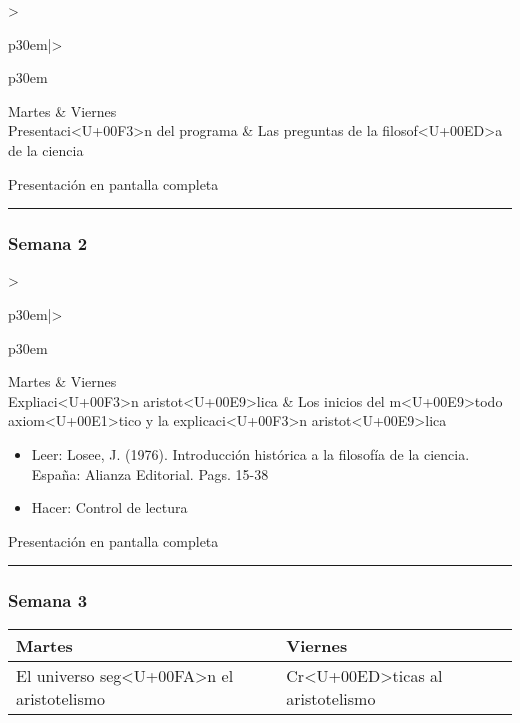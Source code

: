 \documentclass[spanish,]{article}
\begin{document}
\begin{tabular}{>{\raggedright\arraybackslash}p{30em}|>{\raggedright\arraybackslash}p{30em}}
\hline
Martes & Viernes\\
\hline
Presentaci<U+00F3>n del programa & Las preguntas de la filosof<U+00ED>a de la ciencia\\
\hline
\end{tabular}

Presentación en pantalla completa

\begin{center}\rule{0.5\linewidth}{\linethickness}\end{center}

\subsubsection{Semana 2}\label{semana-2}

\begin{tabular}{>{\raggedright\arraybackslash}p{30em}|>{\raggedright\arraybackslash}p{30em}}
\hline
Martes & Viernes\\
\hline
Expliaci<U+00F3>n aristot<U+00E9>lica & Los inicios del m<U+00E9>todo axiom<U+00E1>tico y la explicaci<U+00F3>n aristot<U+00E9>lica\\
\hline
\end{tabular}

\begin{itemize}
\item
  Leer: Losee, J. (1976). Introducción histórica a la filosofía de la
  ciencia. España: Alianza Editorial. Pags. 15-38
\item
  Hacer: Control de lectura
\end{itemize}

Presentación en pantalla completa

\begin{center}\rule{0.5\linewidth}{\linethickness}\end{center}

\subsubsection{Semana 3}\label{semana-3}

\begin{tabular}{>{\raggedright\arraybackslash}p{30em}|>{\raggedright\arraybackslash}p{30em}}
\hline
Martes & Viernes\\
\hline
El universo seg<U+00FA>n el aristotelismo & Cr<U+00ED>ticas al aristotelismo\\
\hline
\end{tabular}
\end{document}

